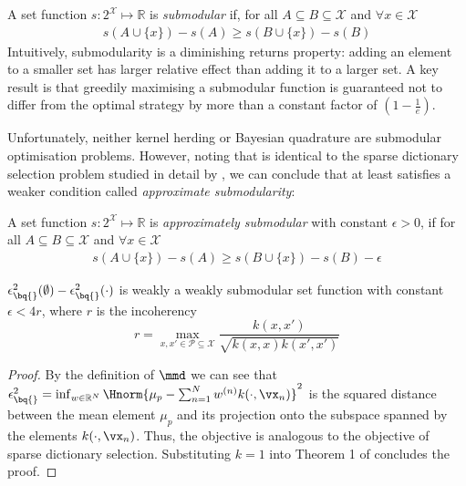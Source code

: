 A set function $s:2^\mathcal{X} \mapsto \mathbb{R}$ is \textit{submodular} if, for all $A\subseteq B\subseteq \mathcal{X}$ and $\forall x \in \mathcal{X}$
%
\begin{align}
	s(A\cup\{x\})-s(A)\geq s(B\cup\{x\})-s(B)
\end{align}
%
Intuitively, submodularity is a diminishing returns property: adding an element to a smaller set has larger relative effect than adding it to a larger set. A key result \cite[see e.\,g.\ ][and references therein]{KrauseCevher10} is that greedily maximising a submodular function is guaranteed not to differ from the optimal strategy by more than a constant factor of $(1-\frac{1}{e})$.

Unfortunately, neither kernel herding or Bayesian quadrature are submodular optimisation problems. However, noting that \sbq{} is identical to the sparse dictionary selection problem studied in detail by \citet{KrauseCevher10}, we can conclude that \sbq{} at least satisfies a weaker condition called \emph{approximate submodularity}:

A set function $s:2^\mathcal{X} \mapsto \mathbb{R}$ is \textit{approximately submodular} with constant $\epsilon>0$, if for all $A\subseteq B\subseteq \mathcal{X}$ and $\forall x \in \mathcal{X}$
%
\begin{align}
s(A\cup\{x\})-s(A)\geq s(B\cup\{x\})-s(B) - \epsilon
\end{align}

\begin{proposition}\label{prop:submodularity_SBQ}
$\epsilon^{2}_{\bq{}}(\emptyset)-\epsilon^{2}_{\bq{}}(\cdot)$ is weakly a weakly submodular set function with constant $\epsilon<4r$, where $r$ is the incoherency
%
\begin{equation}
	r = \max_{x,x'\in\mathcal{P}\subseteq\mathcal{X}} \frac{k(x,x')}{\sqrt{k(x,x)k(x',x')}}
\end{equation}

\begin{proof} By the definition of $\mmd$ we can see that
$\epsilon^{2}_{\bq{}} = \inf_{w\in\mathbb{R}^N}\Hnorm{\mu_p - \sum_{n=1}^N w^{(n)}k(\cdot,\vx_n)}^2$ is the squared distance between the mean element $\mu_p$ and its projection onto the subspace spanned by the elements $k(\cdot,\vx_n)$. Thus, the objective is analogous to the objective of sparse dictionary selection. Substituting $k=1$ into Theorem 1 of \citet{KrauseCevher10} concludes the proof.
\end{proof}
\end{proposition}

